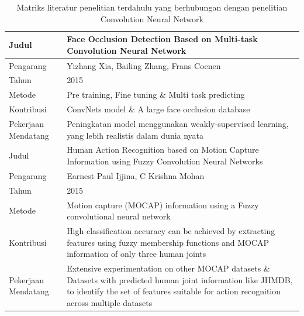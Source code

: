 \begin{table}
	\centering
	\caption{Matriks literatur penelitian terdahulu yang berhubungan dengan penelitian Convolution Neural Network}
	\label{tab:tab1}
	\begin{tabular}{ |m{2cm}|m{7cm}|m{1cm}|m{1cm}| } 
		\hline
		Judul & \multicolumn{3}{|m{13cm}|}{Face Occlusion Detection Based on Multi-task Convolution Neural Network} \\
		\hline
		Pengarang & \multicolumn{3}{|m{13cm}|}{Yizhang Xia, Bailing Zhang, Frans Coenen} \\ 
		\hline
		Tahun & \multicolumn{3}{|m{13cm}|}{2015} \\ 
		\hline
		Metode & \multicolumn{3}{|m{13cm}|}{Pre training, Fine tuning \& Multi task predicting}\\
		\hline
		Kontribusi  & \multicolumn{3}{|m{13cm}|}{ConvNets model \& A large face occlusion database}\\ 
		\hline
		Pekerjaan Mendatang  & \multicolumn{3}{|m{13cm}|}{Peningkatan model menggunakan weakly-supervised learning, yang lebih realistis dalam dunia nyata} \\		
		\hline\hline
		
		Judul & \multicolumn{3}{|m{13cm}|}{Human Action Recognition based on Motion Capture Information using Fuzzy Convolution Neural Networks} \\
		\hline
		Pengarang & \multicolumn{3}{|m{13cm}|}{Earnest Paul Ijjina, C Krishna Mohan} \\ 
		\hline
		Tahun & \multicolumn{3}{|m{13cm}|}{2015} \\ 
		\hline
		Metode & \multicolumn{3}{|m{13cm}|}{Motion capture (MOCAP) information using a Fuzzy convolutional neural network}\\
		\hline
		Kontribusi  & \multicolumn{3}{|m{13cm}|}{High classification accuracy can be achieved by extracting features using fuzzy membership functions and MOCAP information of only three human joints}\\ 
		\hline
		Pekerjaan Mendatang  & \multicolumn{3}{|m{13cm}|}{Extensive experimentation on other MOCAP datasets \& Datasets with predicted human joint information like JHMDB, to identify the set of features suitable for action recognition across multiple datasets} \\ 
		\hline\hline
		

\end{tabular}
\end{table}
